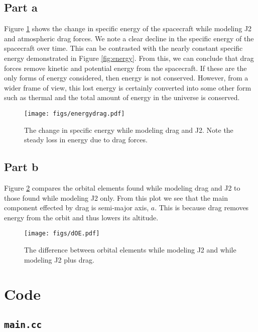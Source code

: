 \documentclass[11pt]{article}
\begin{document}
\subsection{Part a}

Figure \ref{fig:energydrag} shows the change in specific energy of the spacecraft while modeling J2 and atmospheric drag forces. We note a clear decline in the specific energy of the spacecraft over time. This can be contrasted with the nearly constant specific energy demonstrated in Figure \ref{fig:energy}. From this, we can conclude that drag forces remove kinetic and potential energy from the spacecraft. If these are the only forms of energy considered, then energy is not conserved. However, from a wider frame of view, this lost energy is certainly converted into some other form such as thermal and the total amount of energy in the universe is conserved. \\

\begin{figure}[h!]
	\centering
	\texttt{[image: figs/energydrag.pdf]}
	\caption{The change in specific energy while modeling drag and J2. Note the steady loss in energy due to drag forces.}
	\label{fig:energydrag}
\end{figure}

\subsection{Part b}

Figure \ref{fig:dOE} compares the orbital elements found while modeling drag and J2 to those found while modeling J2 only. From this plot we see that the main component effected by drag is semi-major axis, $a$. This is because drag removes energy from the orbit and thus lowers its altitude. \\

\begin{figure}[h!]
	\centering
	\texttt{[image: figs/dOE.pdf]}
	\caption{The difference between orbital elements while modeling J2 and while modeling J2 plus drag.}
	\label{fig:dOE}
\end{figure}

\clearpage
\appendix
\section{Code}

\subsection{\texttt{main.cc}}

\end{document}
